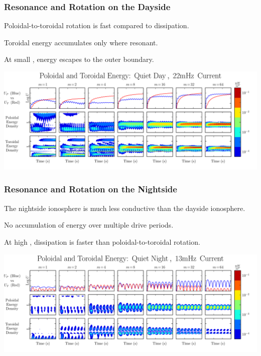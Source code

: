 \documentclass{beamer}
\begin{document}
\begin{frame}
\frametitle{Resonance and Rotation on the Dayside}

\begin{wideitemize}
\item Poloidal-to-toroidal rotation is fast compared to dissipation. 
\item Toroidal energy accumulates only where resonant. 
\item At small \azm, energy escapes to the outer boundary. 
\end{wideitemize}

\vfill 

\includegraphics[width=\textwidth]{figures/energy_day.pdf}

\end{frame}


\begin{frame}
\frametitle{Resonance and Rotation on the Nightside}

\begin{wideitemize}
\item The nightside ionosphere is much less conductive than the dayside ionosphere. 
\item No accumulation of energy over multiple drive periods. 
\item At high \azm, dissipation is faster than poloidal-to-toroidal rotation. 
\end{wideitemize}

\vfill

\includegraphics[width=\textwidth]{figures/energy_night.pdf}

\end{frame}
\end{document}
